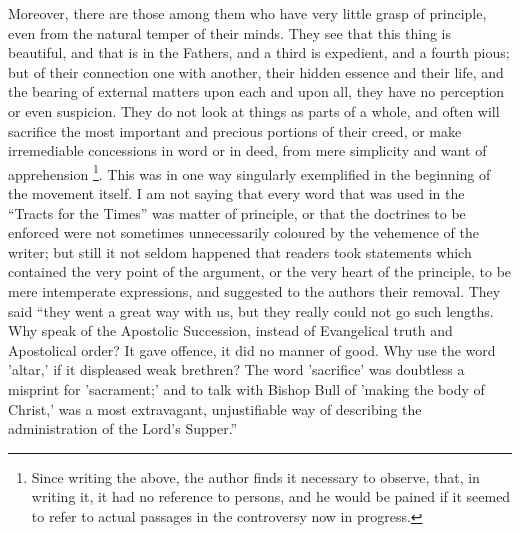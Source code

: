 Moreover, there are those among them who have very little grasp of
principle, even from the natural temper of their minds. They see that
this thing is beautiful, and that is in the Fathers, and a third is
expedient, and a fourth pious; but of their connection one with
another, their hidden essence and their life, and the bearing of
external matters upon each and upon all, they have no perception or
even suspicion. They do not look at things as parts of a whole, and
often will sacrifice the most important and precious portions of their
creed, or make irremediable concessions in word or in deed, from mere
simplicity and want of apprehension \footnote{Since writing the above, the author finds it
necessary to observe, that, in writing it, it had no reference to
persons, and he would be pained if it seemed to refer to actual
passages in the controversy now in progress.}. This was in one way singularly exemplified in the beginning
of the movement itself. I am not saying that every word that was used
in the ``Tracts for the Times'' was matter of principle, or
that the doctrines to be enforced were not sometimes unnecessarily
coloured by the vehemence of the writer; but still it not seldom
happened that readers took statements which contained the very point
of the argument, or the very heart of the principle, to be mere
intemperate expressions, and suggested to the authors their removal.
They said ``they went a great way with us, but they really could
not go such lengths. Why speak of the Apostolic Succession, instead of
Evangelical truth and Apostolical order? It gave offence, it did no
manner of good. Why use the word 'altar,' if it displeased weak
brethren? The word 'sacrifice' was doubtless a misprint for
'sacrament;' and to talk with Bishop Bull of 'making the body of
Christ,' was a most extravagant, unjustifiable way of describing the
administration of the Lord's Supper.''

